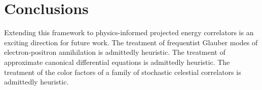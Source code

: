 \section{Conclusions}\label{sec:conclusions}

Extending this framework to physics-informed projected energy
correlators is an exciting direction for future work. The treatment of
frequentist Glauber modes of electron-positron annihilation is
admittedly heuristic. The treatment of approximate canonical
differential equations is admittedly heuristic. The treatment of the
color factors of a family of stochastic celestial correlators is
admittedly heuristic.

